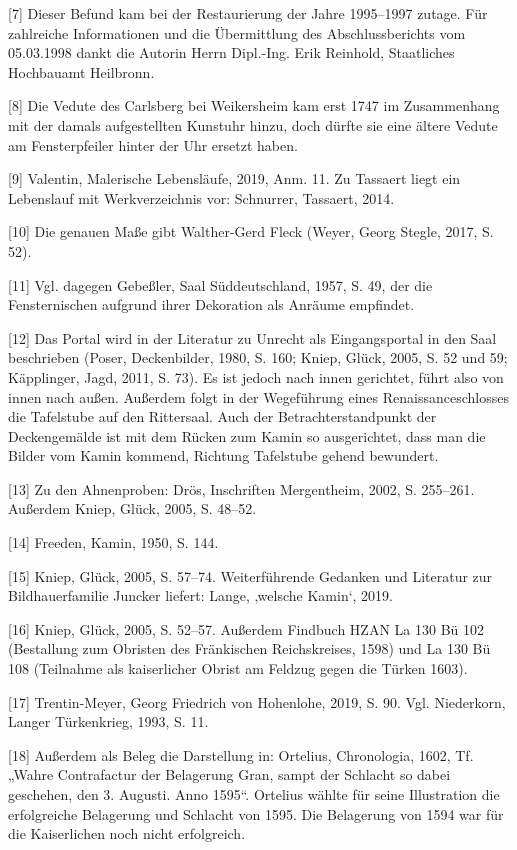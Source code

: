 \documentclass[
  letterpaper,
]{book}
\begin{document}
{[}7{]} Dieser Befund kam bei der Restaurierung der Jahre 1995--1997
zutage. Für zahlreiche Informationen und die Übermittlung des
Abschlussberichts vom 05.03.1998 dankt die Autorin Herrn Dipl.-Ing. Erik
Reinhold, Staatliches Hochbauamt Heilbronn.

{[}8{]} Die Vedute des Carlsberg bei Weikersheim kam erst 1747 im
Zusammenhang mit der damals aufgestellten Kunstuhr hinzu, doch dürfte
sie eine ältere Vedute am Fensterpfeiler hinter der Uhr ersetzt haben.

{[}9{]} Valentin, Malerische Lebensläufe, 2019, Anm. 11. Zu Tassaert
liegt ein Lebenslauf mit Werkverzeichnis vor: Schnurrer, Tassaert, 2014.

{[}10{]} Die genauen Maße gibt Walther-Gerd Fleck (Weyer, Georg Stegle,
2017, S. 52).

{[}11{]} Vgl. dagegen Gebeßler, Saal Süddeutschland, 1957, S. 49, der
die Fensternischen aufgrund ihrer Dekoration als Anräume empfindet.

{[}12{]} Das Portal wird in der Literatur zu Unrecht als Eingangsportal
in den Saal beschrieben (Poser, Deckenbilder, 1980, S. 160; Kniep,
Glück, 2005, S. 52 und 59; Käpplinger, Jagd, 2011, S. 73). Es ist jedoch
nach innen gerichtet, führt also von innen nach außen. Außerdem folgt in
der Wegeführung eines Renaissanceschlosses die Tafelstube auf den
Rittersaal. Auch der Betrachterstandpunkt der Deckengemälde ist mit dem
Rücken zum Kamin so ausgerichtet, dass man die Bilder vom Kamin kommend,
Richtung Tafelstube gehend bewundert.

{[}13{]} Zu den Ahnenproben: Drös, Inschriften Mergentheim, 2002, S.
255--261. Außerdem Kniep, Glück, 2005, S. 48--52.

{[}14{]} Freeden, Kamin, 1950, S. 144.

{[}15{]} Kniep, Glück, 2005, S. 57--74. Weiterführende Gedanken und
Literatur zur Bildhauerfamilie Juncker liefert: Lange, ‚welsche Kamin`,
2019.

{[}16{]} Kniep, Glück, 2005, S. 52--57. Außerdem Findbuch HZAN La 130 Bü
102 (Bestallung zum Obristen des Fränkischen Reichskreises, 1598) und La
130 Bü 108 (Teilnahme als kaiserlicher Obrist am Feldzug gegen die
Türken 1603).

{[}17{]} Trentin-Meyer, Georg Friedrich von Hohenlohe, 2019, S. 90. Vgl.
Niederkorn, Langer Türkenkrieg, 1993, S. 11.

{[}18{]} Außerdem als Beleg die Darstellung in: Ortelius, Chronologia,
1602, Tf. „Wahre Contrafactur der Belagerung Gran, sampt der Schlacht so
dabei geschehen, den 3. Augusti. Anno 1595``. Ortelius wählte für seine
Illustration die erfolgreiche Belagerung und Schlacht von 1595. Die
Belagerung von 1594 war für die Kaiserlichen noch nicht erfolgreich.
\end{document}
